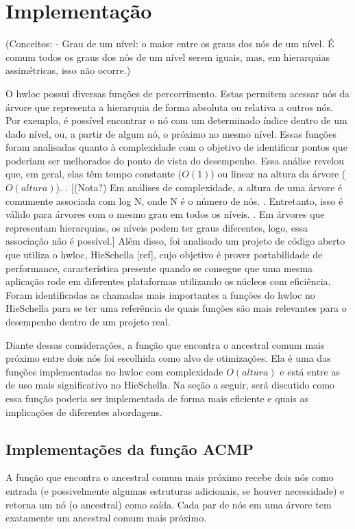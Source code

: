 \documentclass{ufsc-thesis}
\begin{document}

\chapter{Implementação}

(Conceitos:
- Grau de um nível: o maior entre os graus dos nós de um nível.
É comum todos os graus dos nós de um nível serem iguais, mas, em hierarquias assimétricas, isso não ocorre.)

O hwloc possui diversas funções de percorrimento.
Estas permitem acessar nós da árvore que representa a hierarquia de forma absoluta ou relativa a outros nós.
Por exemplo, é possível encontrar o nó com um determinado índice dentro de um dado nível,
ou, a partir de algum nó, o próximo no mesmo nível.
Essas funções foram analisadas quanto à complexidade com o objetivo de identificar pontos que poderiam ser melhorados do ponto de vista do desempenho.
Essa análise revelou que, em geral, elas têm tempo constante ($O(1)$) ou linear na altura da árvore ($O(altura)$).
. [(Nota?) Em análises de complexidade, a altura de uma árvore é comumente associada com log N, onde N é o número de nós.
. Entretanto, isso é válido para árvores com o mesmo grau em todos os níveis.
. Em árvores que representam hierarquias, os níveis podem ter graus diferentes, logo, essa associação não é possível.]
Além disso, foi analisado um projeto de código aberto que utiliza o hwloc, HieSchella [ref],
cujo objetivo é prover portabilidade de performance, característica presente quando se consegue que
uma mesma aplicação rode em diferentes plataformas utilizando os núcleos com eficiência.
Foram identificadas as chamadas mais importantes a funções do hwloc no HieSchella para se ter uma referência
de quais funções são mais relevantes para o desempenho dentro de um projeto real.

Diante dessas considerações, a função que encontra o ancestral comum mais próximo entre dois nós foi escolhida como alvo de otimizações.
Ela é uma das funções implementadas no hwloc com complexidade $O(altura)$ e está entre as de uso mais significativo no HieSchella.
Na seção a seguir, será discutido como essa função poderia ser implementada de forma mais eficiente e quais as implicações de diferentes abordagens.


\section{Implementações da função ACMP}

A função que encontra o ancestral comum mais próximo recebe dois nós como entrada (e possivelmente algumas estruturas adicionais, se houver necessidade)
e retorna um nó (o ancestral) como saída.
Cada par de nós em uma árvore tem exatamente um ancestral comum mais próximo.
\end{document}
